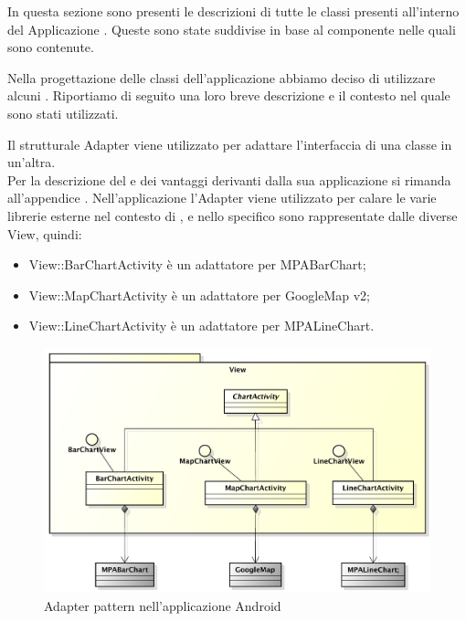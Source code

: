         In questa sezione sono presenti le descrizioni di tutte le classi presenti all'interno del  Applicazione . Queste sono state suddivise in base al componente nelle quali sono contenute.
        
        
    

        Nella progettazione delle classi dell'applicazione abbiamo deciso di utilizzare alcuni . Riportiamo di seguito una loro breve descrizione e il contesto nel quale sono stati utilizzati.
        
            Il  strutturale Adapter viene utilizzato per adattare l'interfaccia di una classe in un'altra.\\
            Per la descrizione del  e dei vantaggi derivanti dalla sua applicazione si rimanda all'appendice .
                Nell'applicazione  l'Adapter viene utilizzato per calare le varie librerie esterne nel contesto di \projectname{}, e nello specifico sono rappresentate dalle diverse View, quindi:
                \begin{itemize}
                    \item View::BarChartActivity è un adattatore per MPABarChart;
                    \item View::MapChartActivity è un adattatore per GoogleMap   v2;
                    \item View::LineChartActivity è un adattatore per MPALineChart.
                \end{itemize}
                \begin{figure}[H]\centering
	        		\includegraphics[width=\textwidth]{SpecificaTecnica/Pics/DesignPatternApp/Adapter}
	        		\caption{Adapter pattern nell'applicazione Android}
	    		\end{figure}
                
